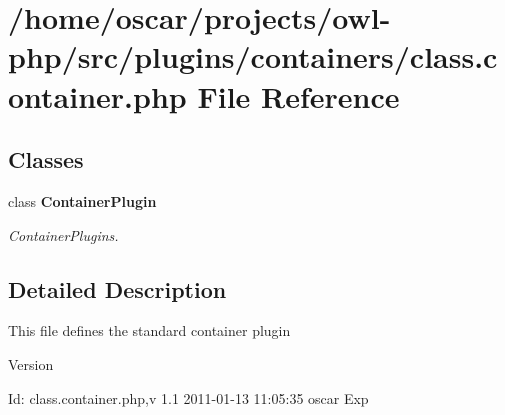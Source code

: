 \section{/home/oscar/projects/owl-\/php/src/plugins/containers/class.container.php File Reference}
\label{plugins_2containers_2class_8container_8php}
\subsection*{Classes}
\begin{DoxyCompactItemize}
\item 
class {\bf ContainerPlugin}
\begin{DoxyCompactList}\small\item\em ContainerPlugins. \end{DoxyCompactList}\end{DoxyCompactItemize}


\subsection{Detailed Description}
This file defines the standard container plugin \begin{DoxyVersion}{Version}

\end{DoxyVersion}
\begin{DoxyParagraph}{Id:}
class.container.php,v 1.1 2011-\/01-\/13 11:05:35 oscar Exp 
\end{DoxyParagraph}
